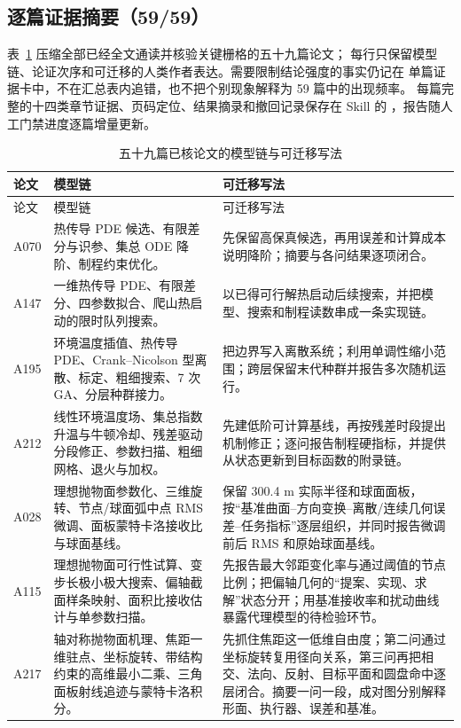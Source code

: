 \documentclass[UTF8,a4paper,12pt]{ctexart}
\begin{document}
\subsection{逐篇证据摘要（59/59）}

表~\ref{tab:verified-paper-cases} 压缩全部已经全文通读并核验关键栅格的五十九篇论文；
每行只保留模型链、论证次序和可迁移的人类作者表达。需要限制结论强度的事实仍记在
单篇证据卡中，不在汇总表内追错，也不把个别现象解释为 59 篇中的出现频率。
每篇完整的十四类章节证据、页码定位、结果摘录和撤回记录保存在 Skill 的
，报告随人工门禁进度逐篇增量更新。

\begin{longtable}{p{1.4cm}p{5.2cm}p{7.0cm}}
\caption{五十九篇已核论文的模型链与可迁移写法}\label{tab:verified-paper-cases}\\
\toprule
论文 & 模型链 & 可迁移写法\\
\midrule
\endfirsthead
\toprule
论文 & 模型链 & 可迁移写法\\
\midrule
\endhead
A070 & 热传导 PDE 候选、有限差分与识参、集总 ODE 降阶、制程约束优化。 &
先保留高保真候选，再用误差和计算成本说明降阶；摘要与各问结果逐项闭合。\\
A147 & 一维热传导 PDE、有限差分、四参数拟合、爬山热启动的限时队列搜索。 &
以已得可行解热启动后续搜索，并把模型、搜索和制程读数串成一条实现链。\\
A195 & 环境温度插值、热传导 PDE、Crank--Nicolson 型离散、标定、粗细搜索、7 次 GA、分层种群接力。 &
把边界写入离散系统；利用单调性缩小范围；跨层保留末代种群并报告多次随机运行。\\
A212 & 线性环境温度场、集总指数升温与牛顿冷却、残差驱动分段修正、参数扫描、粗细网格、退火与加权。 &
先建低阶可计算基线，再按残差时段提出机制修正；逐问报告制程硬指标，并提供从状态更新到目标函数的附录链。\\
A028 & 理想抛物面参数化、三维旋转、节点/球面弧中点 RMS 微调、面板蒙特卡洛接收比与球面基线。 &
保留 300.4 m 实际半径和球面面板，按“基准曲面--方向变换--离散/连续几何误差--任务指标”逐层组织，并同时报告微调前后 RMS 和原始球面基线。\\
A115 & 理想抛物面可行性试算、变步长极小极大搜索、偏轴截面样条映射、面积比接收估计与单参数扫描。 &
先报告最大邻距变化率与通过阈值的节点比例；把偏轴几何的“提案、实现、求解”状态分开；用基准接收率和扰动曲线暴露代理模型的待检验环节。\\
A217 & 轴对称抛物面机理、焦距一维驻点、坐标旋转、带结构约束的高维最小二乘、三角面板射线追迹与蒙特卡洛积分。 &
先抓住焦距这一低维自由度；第二问通过坐标旋转复用径向关系，第三问再把相交、法向、反射、目标平面和圆盘命中逐层闭合。摘要一问一段，成对图分别解释形面、执行器、误差和基准。\\

\end{longtable}
\end{document}
